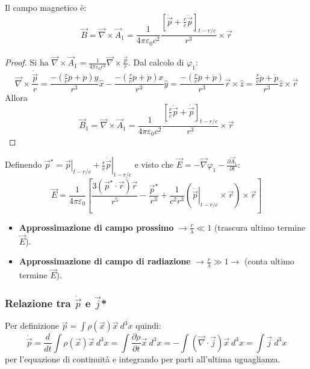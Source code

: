 \documentclass[10pt, a4paper]{scrartcl}
\newcommand*\Eval[3]{\left.#1\right\rvert_{#2}^{#3}}
\numberwithin{equation}{subsection}
\theoremstyle{style1}
\newenvironment{boxenv}[1][]{
    \begin{eqbox}[#1]
    }{
   \end{eqbox}
}
\begin{document}
\noindent Il campo magnetico \`e:
\begin{equation}
	\vec{B}=\vec{\nabla }\times \vec{A}_1 = \frac{1}{4\pi \varepsilon _0 c^2} \frac{\left[ \dot{\vec{p}}+\frac{r}{c}\ddot{\vec{p}} \right] _{t - r /c} }{r^3} \times \vec{r}
\end{equation}
\begin{boxenv}[]
\begin{proof}
	Si ha $\vec{\nabla }\times \vec{A}_1 = \frac{1}{4\pi \varepsilon _0 c^2} \vec{\nabla }\times \frac{\dot{\vec{p}}}{r}$. Dal calcolo di $\varphi _1$:
	\[
	\vec{\nabla }\times \frac{\dot{\vec{p}}}{r} = \frac{-\left(\frac{r}{c}\ddot{p} + \dot{p}\right)y }{r^3}\hat{x} - \frac{-\left(\frac{r}{c}\ddot{p} + \dot{p}\right)x }{r^3}\hat{y} = \frac{-\left(\frac{r}{c}\ddot{p} + \dot{p}\right) }{r^3}\vec{r}\times \hat{z} =\frac{\frac{r}{c}\ddot{p} + \dot{p}}{r^3} \hat{z} \times \vec{r}
	\] 
	Allora
	\begin{equation}
		\vec{B}_1 = \vec{\nabla }\times \vec{A}_1 = \frac{1}{4\pi \varepsilon _0 c^2} \frac{\left[ \frac{r}{c}\ddot{\vec{p}} + \dot{\vec{p}} \right] _{t - r / c} }{r^3}\times \vec{r}
	\end{equation}
\end{proof}
\end{boxenv}
\noindent Definendo $\vec{p}^\star = \Eval{\vec{p}}{t - r / c}{} + \frac{r}{c}\Eval{\dot{\vec{p}}}{t - r /c}{}$ e visto che $\vec{E}=-\vec{\nabla }\varphi _1 - \frac{\partial \vec{A}_1}{\partial t} $:
\begin{equation}
	\vec{E}=\frac{1}{4\pi \varepsilon _0} \left[ \frac{3(\vec{p}^\star \cdot \vec{r})\vec{r}}{r^5} - \frac{\vec{p}^\star}{r^3} + \frac{1}{c^2 r^3}\left(\Eval{\ddot{\vec{p}}}{t - r /c}{}\times \vec{r}\right) \times \vec{r} \right] 
\end{equation}
\begin{itemize}
	\item \textbf{Approssimazione di campo prossimo}  $\to \frac{r}{\lambda }\ll 1$ (trascura ultimo termine $\vec{E}$).
		\item\textbf{Approssimazione di campo di radiazione} $\to \frac{r}{\lambda }\gg 1 \to$ (conta ultimo termine $\vec{E}$).
\end{itemize}
\subsubsection{Relazione tra $\dot{\vec{p}}$ e $\vec{j}$*}
Per definizione $\vec{p}=\int \rho (\vec{x}) \vec{x} \ d^3 x$ quindi: 
\begin{equation}
\dot{\vec{p}}= \frac{d }{d t} \int \rho (\vec{x}) \vec{x}\ d^3 x =  \int \frac{\partial \rho }{\partial t} \vec{x}\ d^3 x = - \int (\vec{\nabla }\cdot \vec{j}) \vec{x}\ d^3 x = \int \vec{j}\ d^3 x 
\end{equation}
per l'equazione di continuit\`a e integrando per parti all'ultima uguaglianza.
\end{document}
